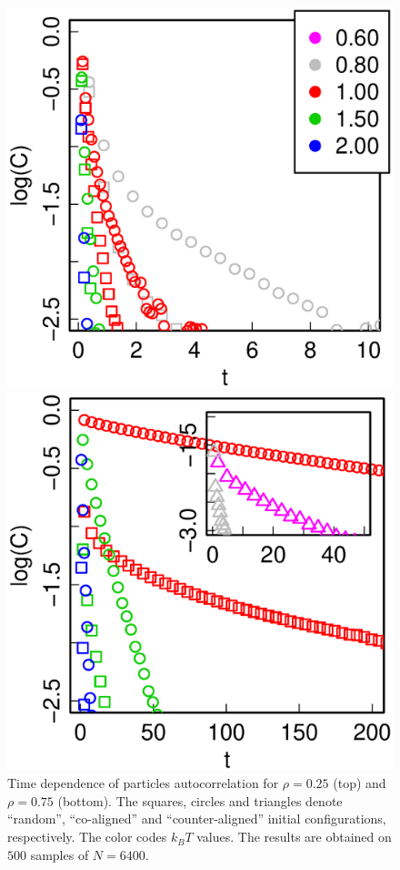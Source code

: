 \begin{figure}[t]
\centering
	\begin{minipage}[c]{0.7\columnwidth}
		\includegraphics[width=\textwidth]{Images/Autocors_25}
	\end{minipage}
	\begin{minipage}[c]{0.7\columnwidth}
		\includegraphics[width=\textwidth]{Images/Autocors_75}
	\end{minipage}
	\caption{Time dependence of particles autocorrelation for $\rho = 0.25$ (top) and $\rho = 0.75$ (bottom). The squares, circles and triangles denote ``random'', ``co-aligned'' and ``counter-aligned'' initial configurations, respectively. The color codes $k_BT$ values. The results are obtained on $500$ samples of $N = 6400$.}
	\label{fig:autocorrelation}
\end{figure}

